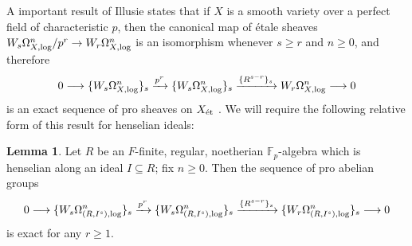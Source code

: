 \documentclass{amsart}
\theoremstyle{definition}
\newtheorem{lemma}[definition]{Lemma}
\newcommand{\bb}{\mathbb}
\newcommand{\To}{\longrightarrow}
\newcommand{\sub}[1]{{\mbox{\rm \scriptsize #1}}}
\newcommand{\xto}{\xrightarrow}
\begin{document}
A important result of Illusie states that if $X$ is a smooth variety over a
perfect field of characteristic $p$, then the canonical map of \'etale sheaves
$W_{s}\Omega^n_{X,\sub{log}}/p^r\to W_r\Omega^n_{X,\sub{log}}$ is an isomorphism
whenever $s\ge r$ and $n\ge0$, and therefore \[0\To
\{W_s\Omega^n_{X,\sub{log}}\}_s\xto{p^r}
\{W_s\Omega^n_{X,\sub{log}}\}_s\xto{\{R^{s-r}\}_s}W_r\Omega^n_{X,\sub{log}}\To
0\] is an exact sequence of pro sheaves on $X_\sub{\'et}$ \cite[\S
I.5.7]{illusie-derham-witt}. We will require the following relative form of this result for henselian ideals:

\begin{lemma}\label{lemma_drw2}
Let $R$ be an $F$-finite, regular, noetherian $\bb F_p$-algebra which is henselian along an ideal $I\subseteq R$; fix $n\ge0$. Then the sequence of pro abelian groups
\[0\To\{W_s\Omega^n_{(R,I^s),\sub{log}}\}_s\xto{p^r}\{W_s\Omega^n_{(R,I^s),\sub{log}}\}_s\xto{\{R^{s-r}\}_s}\{W_r\Omega^n_{(R,I^s),\sub{log}}\}_s\To 0\]
is exact for any $r\ge1$.
\end{lemma}
\end{document}
